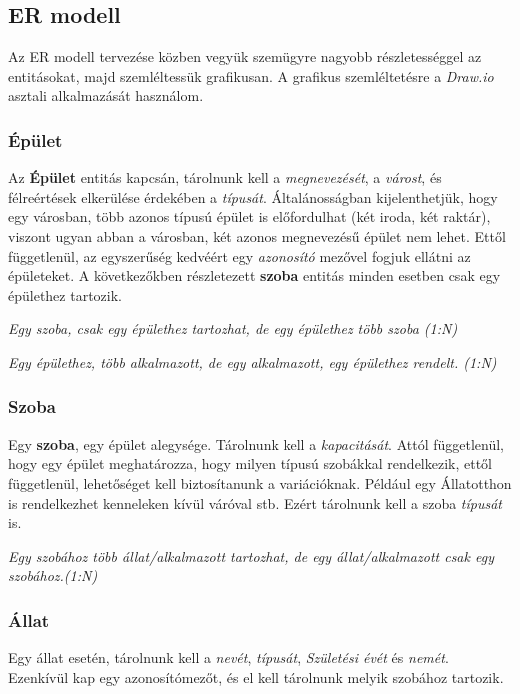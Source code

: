 \documentclass[a4paper,12pt]{article}
\begin{document}
\subsection{ER modell}
Az ER modell tervezése közben vegyük szemügyre nagyobb részletességgel az entitásokat, majd szemléltessük grafikusan. A grafikus szemléltetésre a \textit{Draw.io} asztali alkalmazását használom.

\subsubsection*{Épület}

Az \textbf{Épület} entitás kapcsán, tárolnunk kell a \textit{megnevezését}, a \textit{várost}, és félreértések elkerülése érdekében a \textit{típusát}. Általánosságban kijelenthetjük, hogy egy városban, több azonos típusú épület is előfordulhat (két iroda, két raktár), viszont ugyan abban a városban, két azonos megnevezésű épület nem lehet. Ettől függetlenül, az egyszerűség kedvéért egy \textit{azonosító} mezővel fogjuk ellátni az épületeket. A következőkben részletezett \textbf{szoba} entitás minden esetben csak egy épülethez tartozik.


\begin{center}
	{\small \textit{Egy szoba, csak egy épülethez tartozhat, de egy épülethez több szoba \textit{(1:N)}}}

	{\small \textit{Egy épülethez, több alkalmazott, de egy alkalmazott, egy épülethez rendelt. \textit{(1:N)}}}
\end{center}

\subsubsection*{Szoba}

Egy \textbf{szoba}, egy épület alegysége. Tárolnunk kell a \textit{kapacitását}. Attól függetlenül, hogy egy épület meghatározza, hogy milyen típusú szobákkal rendelkezik, ettől függetlenül, lehetőséget kell biztosítanunk a variációknak. Például egy Állatotthon is rendelkezhet kenneleken kívül váróval stb. Ezért tárolnunk kell a szoba \textit{típusát} is.

\begin{center}
	\textit{{\small Egy szobához több állat/alkalmazott tartozhat, de egy állat/alkalmazott csak egy szobához.\textit{(1:N)}}}
\end{center}

\subsubsection*{Állat}
Egy állat esetén, tárolnunk kell a \textit{nevét}, \textit{típusát}, \textit{Születési évét} és \textit{nemét}.
Ezenkívül kap egy azonosítómezőt, és el kell tárolnunk melyik szobához tartozik.
\end{document}
